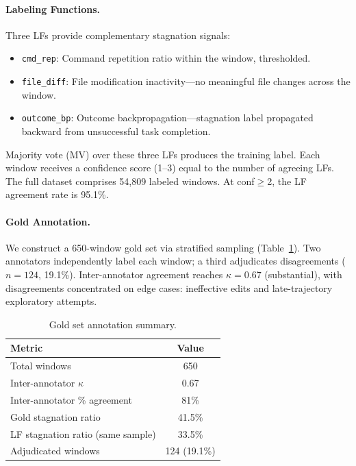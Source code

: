 \documentclass[11pt]{article}
\begin{document}
\paragraph{Labeling Functions.}
Three LFs provide complementary stagnation signals:
\begin{itemize}[leftmargin=*,itemsep=1pt]
\item \texttt{cmd\_rep}: Command repetition ratio within the window, thresholded.
\item \texttt{file\_diff}: File modification inactivity---no meaningful file changes across the window.
\item \texttt{outcome\_bp}: Outcome backpropagation---stagnation label propagated backward from unsuccessful task completion.
\end{itemize}
Majority vote (MV) over these three LFs produces the training label. Each window receives a confidence score (1--3) equal to the number of agreeing LFs. The full dataset comprises 54,809 labeled windows. At conf$\geq$2, the LF agreement rate is 95.1\%.

\paragraph{Gold Annotation.}
\label{sec:gold-annotation}
We construct a 650-window gold set via stratified sampling (Table~\ref{tab:gold-stats}). Two annotators independently label each window; a third adjudicates disagreements ($n\!=\!124$, 19.1\%). Inter-annotator agreement reaches $\kappa\!=\!0.67$ (substantial), with disagreements concentrated on edge cases: ineffective edits and late-trajectory exploratory attempts.

\begin{table}[t]
\centering
\small
\caption{Gold set annotation summary.}
\label{tab:gold-stats}
\begin{tabular}{lc}
\toprule
Metric & Value \\
\midrule
Total windows & 650 \\
Inter-annotator $\kappa$ & 0.67 \\
Inter-annotator \% agreement & 81\% \\
Gold stagnation ratio & 41.5\% \\
LF stagnation ratio (same sample) & 33.5\% \\
Adjudicated windows & 124 (19.1\%) \\
\bottomrule
\end{tabular}
\end{table}
\end{document}
